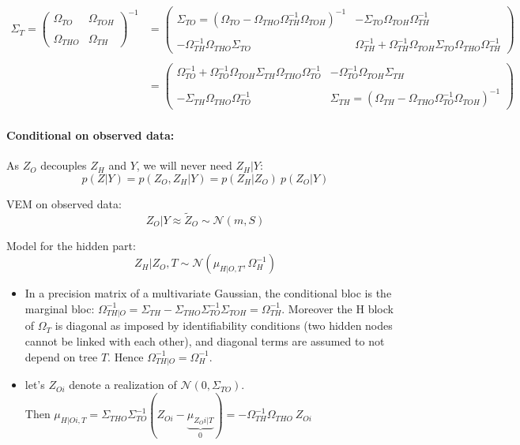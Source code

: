 \documentclass[11pt,a4paper]{article}
\begin{document}
\begin{align*}
 \Sigma_T=
  \left( {\begin{array}{cc}
  \Omega_{TO} &  \Omega_{TOH}\\\\
  \Omega_{THO} & \Omega_{TH}
  \end{array} } \right)^{-1} &=
  \left( {\begin{array}{cc}
  \Sigma_{TO} =( \Omega_{TO} - \Omega_{THO}\Omega_{TH}^{-1}\Omega_{TOH})^{-1} &  - \Sigma_{TO} \Omega_{TOH}\Omega_{TH}^{-1}\\\\
 -\Omega_{TH}^{-1}\Omega_{THO}\Sigma_{TO} & \Omega_{TH}^{-1}+\Omega_{TH}^{-1}\Omega_{TOH}\Sigma_{TO}\Omega_{THO}\Omega_{TH}^{-1}
  \end{array} } \right)\\\\
  &=   \left( {\begin{array}{cc}
   \Omega_{TO}^{-1}+\Omega_{TO}^{-1}\Omega_{TOH}\Sigma_{TH}\Omega_{THO}\Omega_{TO}^{-1} & -\Omega_{TO}^{-1}\Omega_{TOH}\Sigma_{TH} \\\\
    -\Sigma_{TH}\Omega_{THO}\Omega_{TO}^{-1}&  \Sigma_{TH}= (\Omega_{TH} - \Omega_{THO}\Omega_{TO}^{-1}\Omega_{TOH})^{-1} 
   \end{array} } \right)
\end{align*}
  


\paragraph{Conditional on observed data:\\}


As $Z_O$ decouples $Z_H$ and $Y$, we will never need $Z_H|Y$:
$$ p(Z|Y) = p(Z_O,Z_H | Y) = p(Z_H|Z_O) \: p(Z_O|Y) $$


VEM on observed data: $$Z_O|Y \approx \widetilde{Z}_O \sim \mathcal{N}(m,S)$$

 
Model for the hidden part: $$Z_H|Z_O,T \sim \mathcal{N}(\mu_{H|O,T}, \Omega_{H}^{-1})$$ 

\begin{itemize}
\item In a precision matrix of a multivariate Gaussian, the conditional bloc is the marginal bloc:  $\Omega_{TH|O}^{-1} = \Sigma_{TH} -\Sigma_{THO}\Sigma_{TO}^{-1}\Sigma_{TOH} = \Omega_{TH}^{-1}$. Moreover the H block of $\Omega_T$ is diagonal as imposed by identifiability conditions (two hidden nodes cannot be linked with each other), and diagonal terms are assumed to not depend on tree $T$. Hence $\Omega_{TH|O}^{-1}=\Omega_{H}^{-1}$.

\item let's $Z_{Oi}$ denote a realization of $\mathcal{N}(0,\Sigma_{TO}) $.\\
 Then $\displaystyle  \mu_{H|Oi,T} = \Sigma_{THO}\Sigma_{TO}^{-1}(Z_{Oi}-\underbrace{\mu_{Z_Oi|T}}_{0}) 
 = -\Omega_{TH}^{-1}\Omega_{THO} \: Z_{Oi}
$\\
\end{itemize}
\end{document}
